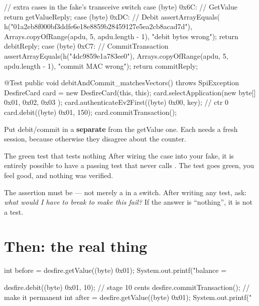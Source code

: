 \begin{jcode}
    // extra cases in the fake's transceive switch
    case (byte) 0x6C:                       // GetValue
        return getValueReply;
    case (byte) 0xDC:                       // Debit
        assertArrayEquals(
            h("01a2eb8f000bf3ddfe6e18e8859b28459127e5ea2cb8acad7d"),
            Arrays.copyOfRange(apdu, 5, apdu.length - 1), "debit bytes wrong");
        return debitReply;
    case (byte) 0xC7:                       // CommitTransaction
        assertArrayEquals(h("4dc9859e1a783ee0"),
            Arrays.copyOfRange(apdu, 5, apdu.length - 1), "commit MAC wrong");
        return commitReply;

    @Test
    public void debitAndCommit_matchesVectors() throws SpiException {
        DesfireCard card = new DesfireCard(this, this);
        card.selectApplication(new byte[]{ 0x01, 0x02, 0x03 });
        card.authenticateEv2First((byte) 0x00, key);    // ctr 0
        card.debit((byte) 0x01, 150);
        card.commitTransaction();
    }
\end{jcode}

Put debit/commit in a \textbf{separate}  from the getValue one. Each
needs a fresh session, because otherwise they disagree about the counter.

\begin{trap}{The green test that tests nothing}
After wiring the  case into your fake, it is entirely possible to have
a passing test that never calls . The test goes green, you feel
good, and nothing was verified.

The assertion must be  ---
not merely a  in a switch. After writing any test, ask: \emph{what
would I have to break to make this fail?} If the answer is ``nothing'', it is not
a test.
\end{trap}

\section{Then: the real thing}

\begin{jcode}
int before = desfire.getValue((byte) 0x01);
System.out.printf("balance = %

desfire.debit((byte) 0x01, 10);          // stage 10 cents
desfire.commitTransaction();             // make it permanent
int after = desfire.getValue((byte) 0x01);
System.out.printf("%
\end{jcode}

